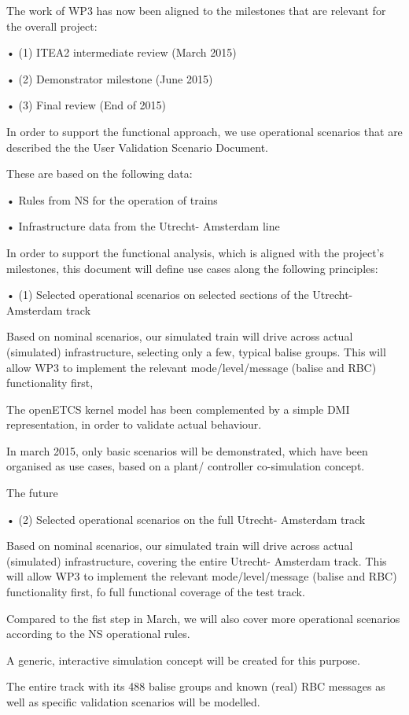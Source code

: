 The work of WP3 has now been aligned to the milestones that are relevant for the overall project:

•  (1) ITEA2 intermediate review (March 2015)

•  (2) Demonstrator milestone (June 2015)

•  (3) Final review (End of 2015)

In order to support the functional approach, we use operational scenarios that are described the the User Validation Scenario Document.

These are based on the following data:

•  Rules from NS for the operation of trains

•  Infrastructure data from the Utrecht- Amsterdam line

In order to support the functional analysis, which is aligned with the project's milestones, this document will define use cases along the following principles:

•  (1) Selected operational scenarios on selected sections of the Utrecht- Amsterdam track

Based on nominal scenarios, our simulated train will drive across actual (simulated) infrastructure, selecting only a few, typical balise groups.
This will allow WP3 to implement the relevant mode/level/message (balise and RBC) functionality first,

The openETCS kernel model has been complemented by a simple DMI representation, in order to validate actual behaviour. 

In march 2015, only basic scenarios will be demonstrated, which have been organised as use cases, based on a plant/ controller co-simulation concept.

The future 


•  (2) Selected operational scenarios on the full Utrecht- Amsterdam track

Based on nominal scenarios, our simulated train will drive across actual (simulated) infrastructure, covering the entire Utrecht- Amsterdam track.
This will allow WP3 to implement the relevant mode/level/message (balise and RBC) functionality first, fo full functional coverage of the test track.

Compared to the fist step in March, we will also cover more operational scenarios according to the NS operational rules.

A generic, interactive simulation concept will be created for this purpose. 

The entire track with its 488 balise groups and known (real) RBC messages as well as specific validation scenarios will be modelled.

